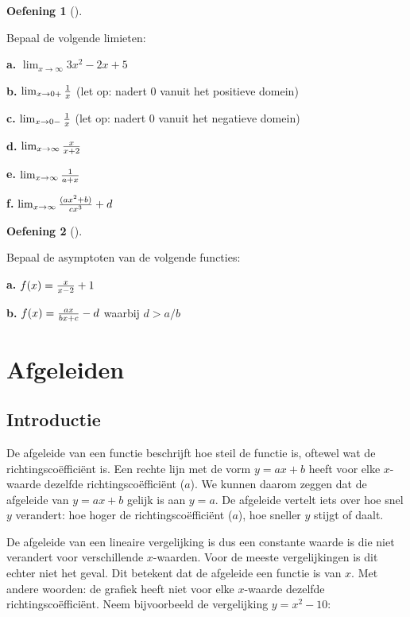 \documentclass[
  a4paper,
]{scrbook}
\theoremstyle{definition}
\newtheorem{exercise}{Oefening}[chapter]
\theoremstyle{remark}
\begin{document}
\begin{exercise}[]\protect\hypertarget{exr-asymp-1}{}\label{exr-asymp-1}

Bepaal de volgende limieten:

\textbf{a.} \(\lim_{x\to\infty}3x^2-2x+5\)

\textbf{b.} \(\lim_{ x \to 0+} {1 \over x}\) (let op: nadert 0 vanuit
het positieve domein)

\textbf{c.} \(\lim_{ x \to 0-} {1 \over x}\) (let op: nadert 0 vanuit
het negatieve domein)

\textbf{d.} \(\lim_{x \to \infty}{x \over x+2}\)

\textbf{e.} \(\lim_{x \to \infty}{1 \over a+x}\)

\textbf{f.} \(\lim_{x \to \infty}{(ax^2+b) \over cx^3}+d\)

\end{exercise}

\begin{exercise}[]\protect\hypertarget{exr-asymp-2}{}\label{exr-asymp-2}

Bepaal de asymptoten van de volgende functies:

\textbf{a.} \(f(x) = {x \over x-2} + 1\)

\textbf{b.} \(f(x) = {ax \over bx+c} - d\) waarbij \(d>a/b\)

\end{exercise}

\chapter{Afgeleiden}\label{sec-afgeleiden}

\section{Introductie}\label{introductie-4}

De afgeleide van een functie beschrijft hoe steil de functie is, oftewel
wat de richtingscoëfficiënt is. Een rechte lijn met de vorm \(y=ax+b\)
heeft voor elke \(x\)-waarde dezelfde richtingscoëfficiënt (\(a\)). We
kunnen daarom zeggen dat de afgeleide van \(y=ax+b\) gelijk is aan
\(y=a\). De afgeleide vertelt iets over hoe snel \(y\) verandert: hoe
hoger de richtingscoëfficiënt (\(a\)), hoe sneller \(y\) stijgt of
daalt.

De afgeleide van een lineaire vergelijking is dus een constante waarde
is die niet verandert voor verschillende \(x\)-waarden. Voor de meeste
vergelijkingen is dit echter niet het geval. Dit betekent dat de
afgeleide een functie is van \(x\). Met andere woorden: de grafiek heeft
niet voor elke \(x\)-waarde dezelfde richtingscoëfficiënt. Neem
bijvoorbeeld de vergelijking \(y = x^2 - 10\):
\end{document}
